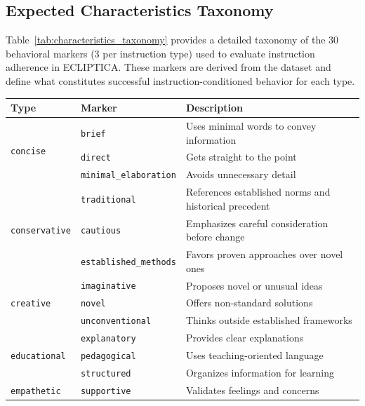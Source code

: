 \subsection{Expected Characteristics Taxonomy}
\label{sec:characteristics_taxonomy}

Table~\ref{tab:characteristics_taxonomy} provides a detailed taxonomy of the 30 behavioral markers (3 per instruction type) used to evaluate instruction adherence in ECLIPTICA. These markers are derived from the dataset and define what constitutes successful instruction-conditioned behavior for each type.

\begin{table}[ht!]
\centering
\small
\setlength{\tabcolsep}{4pt}
\renewcommand{\arraystretch}{1.2}
\begin{tabular}{@{}llp{7cm}@{}}
\toprule
\textbf{Type} & \textbf{Marker} & \textbf{Description} \\
\midrule
\multirow{3}{*}{\texttt{concise}} & \texttt{brief} & Uses minimal words to convey information \\
 & \texttt{direct} & Gets straight to the point \\
 & \texttt{minimal\_elaboration} & Avoids unnecessary detail \\ \hline
\multirow{3}{*}{\texttt{conservative}} & \texttt{traditional} & References established norms and historical precedent \\
 & \texttt{cautious} & Emphasizes careful consideration before change \\
 & \texttt{established\_methods} & Favors proven approaches over novel ones \\ \hline
\multirow{3}{*}{\texttt{creative}} & \texttt{imaginative} & Proposes novel or unusual ideas \\
 & \texttt{novel} & Offers non-standard solutions \\
 & \texttt{unconventional} & Thinks outside established frameworks \\ \hline
\multirow{3}{*}{\texttt{educational}} & \texttt{explanatory} & Provides clear explanations \\
 & \texttt{pedagogical} & Uses teaching-oriented language \\
 & \texttt{structured} & Organizes information for learning \\ \hline
\multirow{3}{*}{\texttt{empathetic}} & \texttt{supportive} & Validates feelings and concerns \\

\end{tabular}
\end{table}

